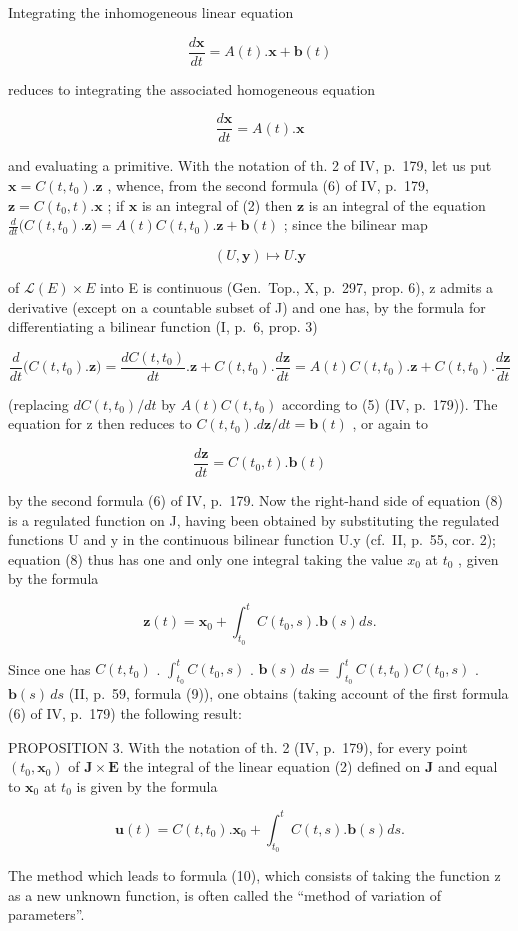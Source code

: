 Integrating the inhomogeneous linear equation

\[
{\frac {d \mathbf {x}}{d t}} = A (t). \mathbf {x} + \mathbf {b} (t)\tag{2}
\]

reduces to integrating the associated homogeneous equation

\[
{\frac {d \mathbf {x}}{d t}} = A (t). \mathbf {x}\tag{4}
\]

and evaluating a primitive. With the notation of th. 2 of IV, p.~179, let us put \(\mathbf{x} = C(t, t_0).\mathbf{z}\) , whence, from the second formula (6) of IV, p.~179, \(\mathbf{z} = C(t_0, t).\mathbf{x}\) ; if \(\mathbf{x}\) is an integral of (2) then \(\mathbf{z}\) is an integral of the equation \(\frac{d}{dt}\big(C(t, t_0).\mathbf{z}\big) = A(t)C(t, t_0).\mathbf{z} + \mathbf{b}(t)\) ; since the bilinear map

\[
(U, \mathbf {y}) \mapsto U. \mathbf {y}
\]

of \(\mathcal{L}(E) \times E\) into E is continuous (Gen.~Top., X, p.~297, prop. 6), z admits a derivative (except on a countable subset of J) and one has, by the formula for differentiating a bilinear function (I, p.~6, prop. 3)

\[
\frac {d}{d t} \big (C (t, t _ {0}). \mathbf {z} \big) = \frac {d C (t , t _ {0})}{d t}. \mathbf {z} + C (t, t _ {0}). \frac {d \mathbf {z}}{d t} = A (t) C (t, t _ {0}). \mathbf {z} + C (t, t _ {0}). \frac {d \mathbf {z}}{d t}
\]

(replacing \(dC(t, t_{0})/dt\) by \(A(t)C(t, t_{0})\) according to (5) (IV, p.~179)). The equation for z then reduces to \(C(t, t_{0}).d\mathbf{z}/dt = \mathbf{b}(t)\) , or again to

\[
\frac {d \mathbf {z}}{d t} = C (t _ {0}, t). \mathbf {b} (t)\tag{8}
\]

by the second formula (6) of IV, p.~179. Now the right-hand side of equation (8) is a regulated function on J, having been obtained by substituting the regulated functions U and y in the continuous bilinear function U.y (cf.~II, p.~55, cor. 2); equation (8) thus has one and only one integral taking the value \(x_{0}\) at \(t_{0}\) , given by the formula

\[
\mathbf {z} (t) = \mathbf {x} _ {0} + \int_ {t _ {0}} ^ {t} C (t _ {0}, s). \mathbf {b} (s) d s.\tag{9}
\]

Since one has \(C(t, t_{0})\) . \(\int_{t_{0}}^{t} C(t_{0}, s)\) . \(\mathbf{b}(s) \, ds = \int_{t_{0}}^{t} C(t, t_{0}) C(t_{0}, s)\) . \(\mathbf{b}(s) \, ds\) (II, p.~59, formula (9)), one obtains (taking account of the first formula (6) of IV, p.~179) the following result:

PROPOSITION 3. With the notation of th. 2 (IV, p.~179), for every point \((t_0, \mathbf{x}_0)\) of \(\mathbf{J} \times \mathbf{E}\) the integral of the linear equation (2) defined on \(\mathbf{J}\) and equal to \(\mathbf{x}_0\) at \(t_0\) is given by the formula

\[
\mathbf {u} (t) = C (t, t _ {0}). \mathbf {x} _ {0} + \int_ {t _ {0}} ^ {t} C (t, s). \mathbf {b} (s) d s.\tag{10}
\]

The method which leads to formula (10), which consists of taking the function z as a new unknown function, is often called the ``method of variation of parameters''.
